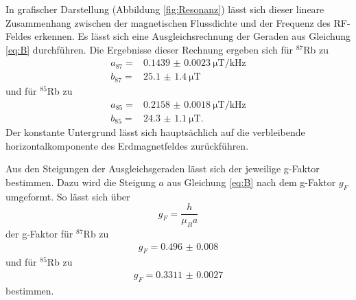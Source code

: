 In grafischer Darstellung (Abbildung \ref{fig:Resonanz}) lässt sich dieser lineare Zusammenhang zwischen der magnetischen Flussdichte und der Frequenz des RF-Feldes erkennen.
Es lässt sich eine Ausgleichsrechnung der Geraden aus Gleichung \eqref{eq:B} durchführen.
Die Ergebnisse dieser Rechnung ergeben sich für $^{87}$Rb zu  
\begin{align*}
    a_{87} = & \SI{0.1439(23)}{\micro\tesla\per\kilo\hertz} \\
    b_{87} = &\SI{25.1(14)}{\micro\tesla} 
\end{align*}
und für $^{85}$Rb zu
\begin{align*}
    a_{85} =& \SI{0.2158(18)}{\micro\tesla\per\kilo\hertz} \\
    b_{85} =&  \SI{24.3(11)}{\micro\tesla}.
\end{align*}
Der konstante Untergrund lässt sich hauptsächlich auf die verbleibende horizontalkomponente des Erdmagnetfeldes zurückführen. 



Aus den Steigungen der Ausgleichsgeraden lässt sich der jeweilige g-Faktor bestimmen.
Dazu wird die Steigung $a$ aus Gleichung \eqref{eq:B} nach dem g-Faktor $g_F$ umgeformt.
So lässt sich über
\begin{equation}
    g_F = \frac{h}{\mu_B a}
\end{equation}
der g-Faktor für $^{87}$Rb zu 
\begin{align*}
    g_F = \num{0.496(8)}
\end{align*}
und für $^{85}$Rb zu 
\begin{align*}
    g_F=\num{0.3311(27)}
\end{align*}
bestimmen.



%
